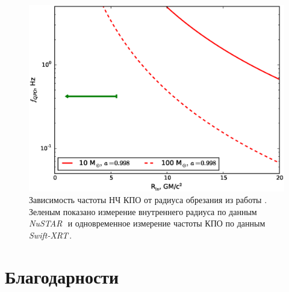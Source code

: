 \documentclass{pazhb}
\def\swiftx{{\em Swift-XRT\,}}
\def\nustar{{\em NuSTAR\,}}
\begin{document}
\begin{figure}
\centerline{\includegraphics[width=\linewidth]{qpo_constr_v02.eps}}
\caption{Зависимость частоты НЧ КПО от радиуса обрезания из работы . Зеленым показано измерение внутреннего радиуса по данным \nustar\, и одновременное измерение частоты КПО по данным \swiftx.}
\label{fig:qpocons}
\end{figure}

\section*{Благодарности}



\acknowledgements

\label{lastpage}




\end{document}
